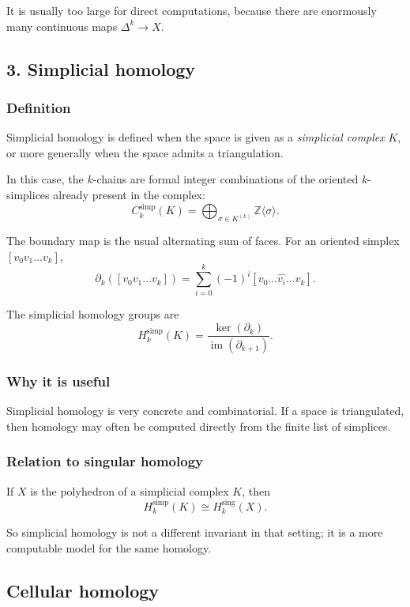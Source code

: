 \documentclass[12pt,a4paper]{article}
\theoremstyle{notespace}
\begin{document}
It is usually too large for direct computations, because there are enormously many continuous maps \(\Delta^k\to X\).

\subsection{3. Simplicial homology}

\subsubsection{Definition}

Simplicial homology is defined when the space is given as a \emph{simplicial complex} \(K\), or more generally when the space admits a triangulation.

In this case, the \(k\)-chains are formal integer combinations of the oriented \(k\)-simplices already present in the complex:
\[
C_k^{\mathrm{simp}}(K)=\bigoplus_{\sigma\in K^{(k)}} \mathbb Z\langle \sigma\rangle.
\]

The boundary map is the usual alternating sum of faces. For an oriented simplex \([v_0v_1\dots v_k]\),
\[
\partial_k([v_0v_1\dots v_k])
=
\sum_{i=0}^k (-1)^i [v_0\dots \widehat{v_i}\dots v_k].
\]

The simplicial homology groups are
\[
H_k^{\mathrm{simp}}(K)=\frac{\ker(\partial_k)}{\operatorname{im}(\partial_{k+1})}.
\]

\subsubsection{Why it is useful}

Simplicial homology is very concrete and combinatorial. If a space is triangulated, then homology may often be computed directly from the finite list of simplices.

\subsubsection{Relation to singular homology}

If \(X\) is the polyhedron of a simplicial complex \(K\), then
\[
H_k^{\mathrm{simp}}(K)\cong H_k^{\mathrm{sing}}(X).
\]

So simplicial homology is not a different invariant in that setting; it is a more computable model for the same homology.

\subsection{ Cellular homology}
\end{document}
